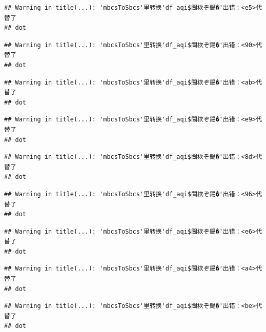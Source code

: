 \documentclass[]{book}
\newenvironment{Shaded}{\begin{snugshade}}{\end{snugshade}}
\newcommand{\DataTypeTok}[1]{\textcolor[rgb]{0.13,0.29,0.53}{#1}}
\newcommand{\DecValTok}[1]{\textcolor[rgb]{0.00,0.00,0.81}{#1}}
\newcommand{\KeywordTok}[1]{\textcolor[rgb]{0.13,0.29,0.53}{\textbf{#1}}}
\newcommand{\NormalTok}[1]{#1}
\newcommand{\OperatorTok}[1]{\textcolor[rgb]{0.81,0.36,0.00}{\textbf{#1}}}
\newcommand{\StringTok}[1]{\textcolor[rgb]{0.31,0.60,0.02}{#1}}
\begin{document}
\begin{verbatim}
## Warning in title(...): 'mbcsToSbcs'里转换'df_aqi$閸栨ぞ鍚�'出错：<e5>代替了
## dot
\end{verbatim}

\begin{verbatim}
## Warning in title(...): 'mbcsToSbcs'里转换'df_aqi$閸栨ぞ鍚�'出错：<90>代替了
## dot
\end{verbatim}

\begin{verbatim}
## Warning in title(...): 'mbcsToSbcs'里转换'df_aqi$閸栨ぞ鍚�'出错：<ab>代替了
## dot
\end{verbatim}

\begin{Shaded}
\end{Shaded}

\begin{verbatim}
## Warning in title(...): 'mbcsToSbcs'里转换'df_aqi$閸栨ぞ鍚�'出错：<e9>代替了
## dot
\end{verbatim}

\begin{verbatim}
## Warning in title(...): 'mbcsToSbcs'里转换'df_aqi$閸栨ぞ鍚�'出错：<8d>代替了
## dot
\end{verbatim}

\begin{verbatim}
## Warning in title(...): 'mbcsToSbcs'里转换'df_aqi$閸栨ぞ鍚�'出错：<96>代替了
## dot
\end{verbatim}

\begin{verbatim}
## Warning in title(...): 'mbcsToSbcs'里转换'df_aqi$閸栨ぞ鍚�'出错：<e6>代替了
## dot
\end{verbatim}

\begin{verbatim}
## Warning in title(...): 'mbcsToSbcs'里转换'df_aqi$閸栨ぞ鍚�'出错：<a4>代替了
## dot
\end{verbatim}

\begin{verbatim}
## Warning in title(...): 'mbcsToSbcs'里转换'df_aqi$閸栨ぞ鍚�'出错：<be>代替了
## dot
\end{verbatim}
\end{document}
